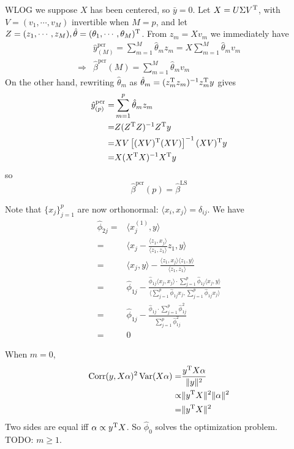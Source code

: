 \begin{sol}
WLOG we suppose $X$ has been centered, so $\bar{y}=0$. Let $X=U\Sigma V^{\mathrm{T}}$, with $V=(v_1,\cdots,v_M)$ invertible when $M=p$, and let $Z=(z_1,\cdots,z_M), \hat{\theta}=(\theta_1,\cdots,\theta_M)^{\mathrm{T}}$. From $z_m=Xv_m$ we immediately have
\begin{align*}
&\hat{y}_{(M)}^\mathrm{pcr}=\sum_{m=1}^{M}\hat{\theta}_mz_m=X\sum_{m=1}^{M}\hat{\theta}_mv_m\\
\Longrightarrow & \hat{\beta}^\mathrm{pcr}(M)=\sum_{m=1}^{M}\hat{\theta}_mv_m
\end{align*}
On the other hand, rewriting $\hat{\theta}_m$ as $\hat{\theta}_m=(z_m^{\mathrm{T}}z_m)^{-1}z_m^{\mathrm{T}}y$ gives 
\begin{align*}
\hat{y}_{(p)}^\mathrm{pcr}=&\sum_{m=1}^{p}\hat{\theta}_mz_m\\
=& Z(Z^{\mathrm{T}}Z)^{-1}Z^{\mathrm{T}}y\\
=& XV\left[(XV)^{\mathrm{T}}(XV)\right]^{-1}(XV)^{\mathrm{T}}y\\
=& X(X^{\mathrm{T}}X)^{-1}X^{\mathrm{T}}y
\end{align*}
so
\[
\hat{\beta}^\mathrm{pcr}(p)=\hat{\beta}^\mathrm{LS}
\]
\end{sol}

\begin{sol}
Note that $\{x_j\}_{j=1}^p$ are now orthonormal: $\langle x_i, x_j\rangle=\delta_{ij}$. We have
\begin{align*}
\hat{\phi}_{2j} =& \langle x_j^{(1)}, y\rangle\\
=& \langle x_j-\frac{\langle z_1, x_j \rangle}{\langle z_1, z_1 \rangle} z_1,y \rangle\\
=& \langle x_j,y\rangle - \frac{\langle z_1, x_j \rangle\langle z_1, y \rangle}{\langle z_1, z_1 \rangle}\\
=& \hat{\phi}_{1j}-\frac{\hat{\phi}_{1j}\langle x_j,x_j \rangle\cdot\sum_{j=1}^p\hat{\phi}_{1j}\langle x_j,y\rangle}{\langle \sum_{j=1}^p\hat{\phi}_{1j}x_j,\sum_{j=1}^p\hat{\phi}_{1j}x_j\rangle}\\
=& \hat{\phi}_{1j}-\frac{\hat{\phi}_{1j}\cdot\sum_{j=1}^p\hat{\phi}_{1j}^2}{ \sum_{j=1}^p\hat{\phi}_{1j}^2}\\
=& 0
\end{align*}
\end{sol}

\begin{sol}
When $m=0$,
\begin{align*}
\operatorname{Corr}(y,X\alpha)^2\operatorname{Var}(X\alpha)=& \frac{y^{\mathrm{T}}X\alpha}{\|y\|^2}\\
\propto & \|y^{\mathrm{T}}X\|^2\|\alpha\|^2\\
=& \|y^{\mathrm{T}}X\|^2
\end{align*}
Two sides are equal iff $\alpha\propto y^{\mathrm{T}}X$. So $\hat{\phi}_0$ solves the optimization problem. \\
TODO: $m\ge 1$.
\end{sol}

